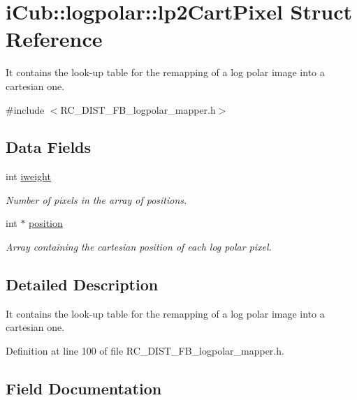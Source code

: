 \section{i\+Cub\+:\+:logpolar\+:\+:lp2\+Cart\+Pixel Struct Reference}
\label{structiCub_1_1logpolar_1_1lp2CartPixel}


It contains the look-\/up table for the remapping of a log polar image into a cartesian one.  




{\ttfamily \#include $<$R\+C\+\_\+\+D\+I\+S\+T\+\_\+\+F\+B\+\_\+logpolar\+\_\+mapper.\+h$>$}

\subsection*{Data Fields}
\begin{DoxyCompactItemize}
\item 
int \hyperlink{structiCub_1_1logpolar_1_1lp2CartPixel_a326dd08c668ee223eb2b22411ceeb25a}{iweight}\label{structiCub_1_1logpolar_1_1lp2CartPixel_a326dd08c668ee223eb2b22411ceeb25a}

\begin{DoxyCompactList}\small\item\em Number of pixels in the array of positions. \end{DoxyCompactList}\item 
int $\ast$ \hyperlink{structiCub_1_1logpolar_1_1lp2CartPixel_a88ee1c54afe68b3a553d48a985981a48}{position}
\begin{DoxyCompactList}\small\item\em Array containing the cartesian position of each log polar pixel. \end{DoxyCompactList}\end{DoxyCompactItemize}


\subsection{Detailed Description}
It contains the look-\/up table for the remapping of a log polar image into a cartesian one. 

Definition at line 100 of file R\+C\+\_\+\+D\+I\+S\+T\+\_\+\+F\+B\+\_\+logpolar\+\_\+mapper.\+h.



\subsection{Field Documentation}
